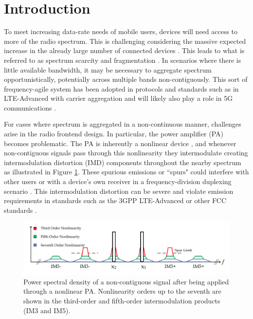 \section{Introduction}
To meet increasing data-rate needs of mobile users, devices will need access to more of the radio spectrum. 
This is challenging considering the massive expected increase in the already large number of connected devices \cite{Cisco16}.
This leads to what is referred to as spectrum scarcity and fragmentation \cite{Staple04,Federated17}. 
In scenarios where there is little available bandwidth, it may be necessary to aggregate spectrum opportunistically, potentially across multiple bands non-contiguously. 
This sort of frequency-agile system has been adopted in protocols and standards such as in LTE-Advanced with carrier aggregation \cite{wannstrom_2013} and will likely also play a role in 5G communications \cite{Khan2014}.  

For cases where spectrum is aggregated in a non-continuous manner, challenges arise in the radio frontend design. 
In particular, the power amplifier (PA) becomes problematic. 
The PA is inherently a nonlinear device \cite{Ghannouchi09}, and whenever non-contiguous signals pass through this nonlinearity they intermodulate creating intermodulation distortion (IMD) components throughout the nearby spectrum as illustrated in Figure \ref{fig:PSD}. These spurious emissions or ``spurs" could interfere with other users or with a device's own receiver in a frequency-division duplexing scenario \cite{Park13}. 
This intermodulation distortion can be severe and violate emission requirements in standards such as the 3GPP LTE-Advanced or other FCC standards    \cite{Commag_abdelaziz,3GPP_CA_Emissions_1,3GPP_CA_Emissions_2,LaehteensuoMay2013}. 

\begin{figure}
	\centering
	\centerline{\includegraphics[width=\columnwidth]{PSD.pdf}}
	\caption[]{Power spectral density of a non-contiguous signal after being applied through a nonlinear PA.
		Nonlinearity orders up to the seventh are shown in the third-order and fifth-order intermodulation products (IM3 and IM5).}
	\label{fig:PSD}
\end{figure}

